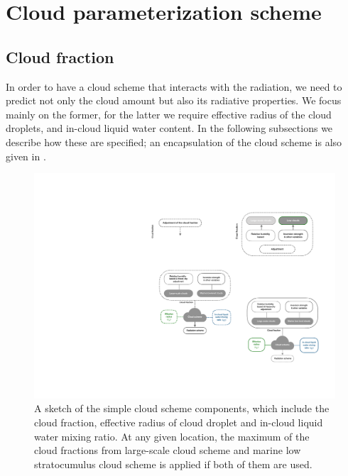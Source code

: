 \section{Cloud parameterization scheme}

\subsection{Cloud fraction}
\label{sec:cld_frac_scheme}

In order to have a cloud scheme that interacts with the radiation, we need to predict not only the cloud amount but also its radiative properties. We focus mainly on the former, for the latter we require effective radius of the cloud droplets, and in-cloud liquid water content. In the following subsections we describe how these are specified; an encapsulation of the cloud scheme is also given in . 

\begin{figure}[t]
	\centering
	\includegraphics[width=0.7\linewidth]{figs/simple_cld_scheme/diag_cld_scheme_summary.pdf}
	\caption{A sketch of the simple cloud scheme components, which include the cloud fraction, effective radius of cloud droplet and in-cloud liquid water mixing ratio. At any given location, the maximum of the cloud fractions from large-scale cloud scheme and marine low stratocumulus cloud scheme is applied if both of them are used.} 
	\label{fig:cld_scheme_summary}
\end{figure}

